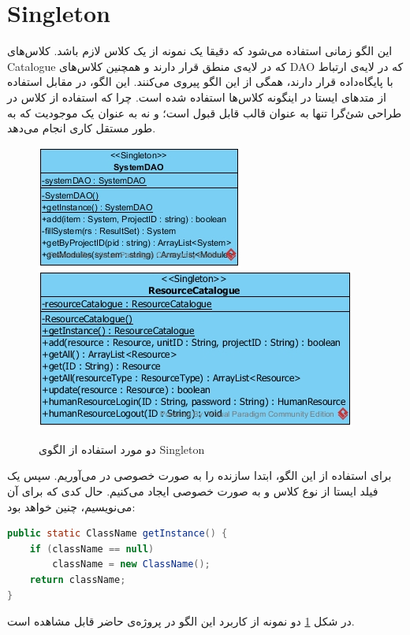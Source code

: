\newpage
\section{Singleton}
این الگو زمانی استفاده می‌شود که دقیقا یک نمونه از یک کلاس لازم باشد. کلاس‌های Catalogue که در لایه‌ی منطق قرار دارند و همچنین کلاس‌های DAO که در لایه‌ی ارتباط با پایگاه‌داده قرار دارند، همگی از این الگو پیروی می‌کنند. این الگو، در مقابل استفاده از متد‌های ایستا در اینگونه کلاس‌ها استفاده شده است. چرا که استفاده از کلاس در طراحی شئ‌گرا تنها به عنوان قالب قابل قبول است؛ و نه به عنوان یک موجودیت که به طور مستقل کاری انجام می‌دهد.

\begin{figure}[H]
	\centering
	\includegraphics[scale=0.5]{img/pattern/singleton1}
	\includegraphics[scale=0.5]{img/pattern/singleton2}
	\caption{دو مورد استفاده از الگوی Singleton}
	\label{f201}
\end{figure}

برای استفاده از این الگو، ابتدا سازنده
را به صورت خصوصی
در می‌آوریم. سپس یک فیلد ایستا  از نوع کلاس و به صورت خصوصی ایجاد می‌کنیم. حال کدی که برای آن می‌نویسیم، چنین خواهد بود:
\begin{latin}
\begin{lstlisting}[language=java]
public static ClassName getInstance() {
	if (className == null)
		className = new ClassName();
	return className;
}
\end{lstlisting}
\end{latin}
در شکل
\ref{f201}
دو نمونه از کاربرد این الگو در پروژه‌ی حاضر قابل مشاهده است.

